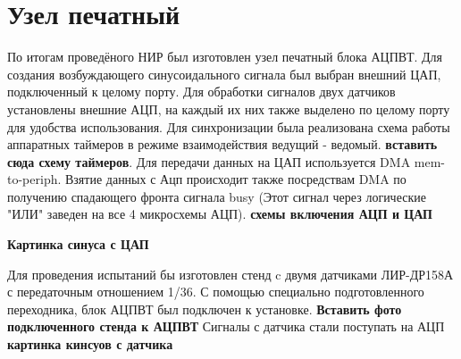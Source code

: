 \section{Узел печатный}

По итогам проведёного НИР был изготовлен узел печатный блока АЦПВТ. Для создания возбуждающего синусоидального сигнала был выбран внешний ЦАП, подключенный к целому порту. 
Для обработки сигналов двух датчиков установлены внешние АЦП, на каждый их них также выделено по целому порту для удобства использования. Для синхронизации была реализована схема 
работы аппаратных таймеров в режиме взаимодействия ведущий - ведомый. \textbf{вставить сюда схему таймеров}. Для передачи данных на ЦАП используется DMA mem-to-periph. 
Взятие данных с Ацп происходит также посредствам DMA по получению спадающего фронта сигнала busy (Этот сигнал через логические "ИЛИ" заведен на все 4 микросхемы АЦП). 
\textbf{схемы включения АЦП и ЦАП}

\textbf{Картинка синуса с ЦАП}

Для проведения испытаний бы изготовлен стенд c двумя датчиками ЛИР-ДР158А с передаточным отношением 1/36. 
С помощью специально подготовленного переходника, блок АЦПВТ был подключен к установке. \textbf{Вставить фото подключенного стенда к АЦПВТ}
Сигналы с датчика стали поступать на АЦП \textbf{картинка кинсуов с датчика}